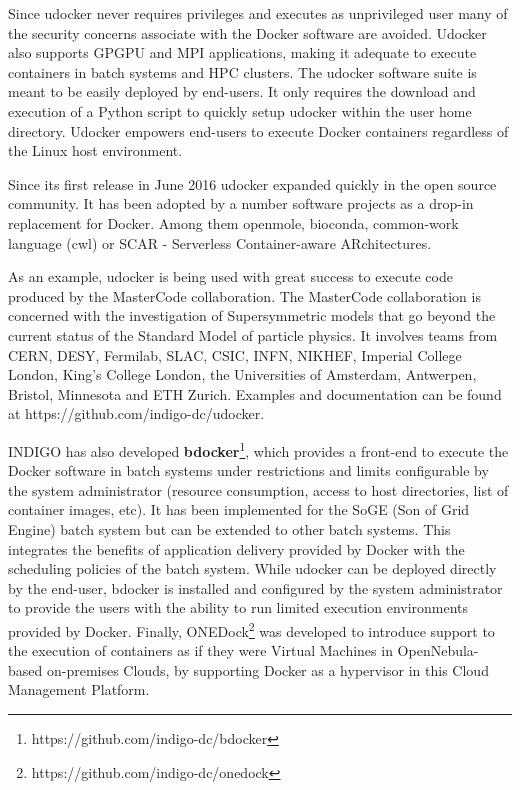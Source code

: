 \documentclass{article}
\begin{document}
Since udocker never requires privileges and executes as unprivileged user many of the security concerns associate with the Docker software are avoided. Udocker also supports GPGPU and MPI applications, making it adequate to execute containers in batch systems and HPC clusters. The udocker software suite is meant to be easily deployed by end-users. It only requires the download and execution of a Python script to quickly setup udocker within the user home directory. Udocker empowers end-users to execute Docker containers regardless of the Linux host environment.

Since its first release in June 2016 udocker expanded quickly in the open source community. It has been adopted by a number software projects as a drop-in replacement for Docker. Among them openmole, bioconda, common-work language (cwl)  or SCAR - Serverless Container-aware ARchitectures\cite{Perez2018scc}.

As an example, udocker  is  being  used  with  great  success  to  execute  code  produced  by  the  MasterCode collaboration\cite{MASTERCODE}.   The   MasterCode   collaboration   is   concerned   with   the   investigation of Supersymmetric  models  that  go  beyond  the  current  status  of  the  Standard  Model  of  particle physics.  It  involves  teams  from  CERN,  DESY,  Fermilab,  SLAC,  CSIC,  INFN,  NIKHEF, Imperial College   London,   King's   College   London,   the   Universities   of   Amsterdam, Antwerpen, Bristol, Minnesota and ETH Zurich. Examples and documentation can be found at https://github.com/indigo-dc/udocker.

INDIGO has also developed {\bf bdocker}\footnote{https://github.com/indigo-dc/bdocker}, which provides a front-end to execute the Docker software in batch systems under restrictions and limits configurable by the system administrator (resource consumption, access to host directories, list of container images, etc). It has been implemented for the SoGE (Son of Grid Engine) batch system but can be extended to other batch systems. This integrates the benefits of application delivery provided by Docker with the scheduling policies of the batch system. While udocker can be deployed directly by the end-user, bdocker is installed and configured by the system administrator to provide the users with the ability to run limited execution environments provided by Docker. Finally, ONEDock\footnote{https://github.com/indigo-dc/onedock} was developed to introduce support to the execution of containers as if they were Virtual Machines in OpenNebula-based on-premises Clouds, by supporting Docker as a hypervisor in this Cloud Management Platform.
\end{document}

